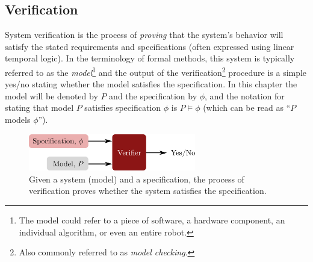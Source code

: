 \subsection{Verification} \label{subsec:verification}
System verification is the process of \textit{proving} that the system's behavior will satisfy the stated requirements and specifications (often expressed using linear temporal logic). In the terminology of formal methods, this system is typically referred to as the \textit{model}\footnote{The model could refer to a piece of software, a hardware component, an individual algorithm, or even an entire robot.} and the output of the verification\footnote{Also commonly referred to as \textit{model checking}.} procedure is a simple yes/no stating whether the model satisfies the specification. In this chapter the model will be denoted by $P$ and the specification by $\phi$, and the notation for stating that model $P$ satisfies specification $\phi$ is $P \models \phi$ (which can be read as ``$P$ models $\phi$'').

\begin{figure}[ht]
\begin{center}
\includegraphics[width=0.65\textwidth]{tex/figs/ch25_figs/verification.png}
\caption{Given a system (model) and a specification, the process of verification proves whether the system satisfies the specification.}
\label{fig:verification}
\end{center}
\end{figure}

